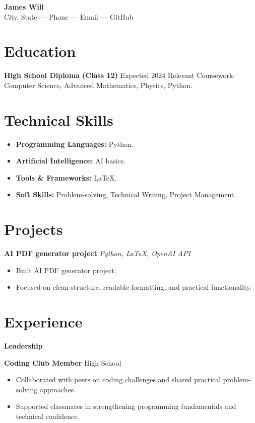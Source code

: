 \documentclass[11pt]{article}
\begin{document}
\begin{center}
    {\LARGE \textbf{James Will}} \\
    \vspace{0.2em}
    City, State --- Phone --- Email --- GitHub
\end{center}

\vspace{0.5em}

\section*{Education}
\textbf{High School Diploma (Class 12)} \hfill Expected 2024
Relevant Coursework: Computer Science, Advanced Mathematics, Physics, Python.

\section*{Technical Skills}
\begin{itemize}
\item \textbf{Programming Languages:} Python.
\item \textbf{Artificial Intelligence:} AI basics.
\item \textbf{Tools \& Frameworks:} LaTeX.
\item \textbf{Soft Skills:} Problem-solving, Technical Writing, Project Management.
\end{itemize}

\section*{Projects}
\textbf{AI PDF generator project} \hfill \textit{Python, LaTeX, OpenAI API}
\begin{itemize}
\item Built AI PDF generator project.
\item Focused on clean structure, readable formatting, and practical functionality.
\end{itemize}

\section*{Experience}
\textbf{Leadership}

\textbf{Coding Club Member} \hfill High School
\begin{itemize}
\item Collaborated with peers on coding challenges and shared practical problem-solving approaches.
\item Supported classmates in strengthening programming fundamentals and technical confidence.
\end{itemize}
\end{document}
